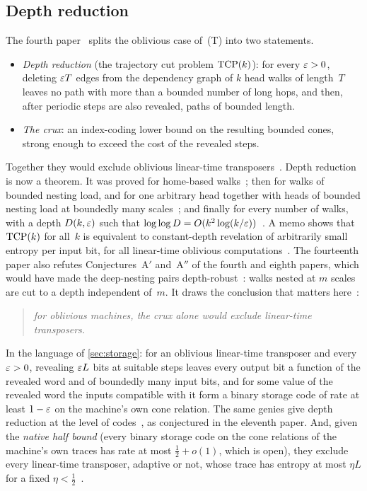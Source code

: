 \subsection{Depth reduction}\label{sec:depth}

The fourth paper~\cite{FourthPaper2026} splits the oblivious case of~(T) into two statements.
\begin{itemize}[leftmargin=1.5em]
\item \emph{Depth reduction} (the trajectory cut problem $\mathrm{TCP}(k)$): for every $\varepsilon>0$, deleting $\varepsilon T$ edges from
the dependency graph of $k$ head walks of length~$T$ leaves no path with more than a bounded number of long hops, and
then, after periodic steps are also revealed, paths of bounded length.
\item \emph{The crux}: an index-coding lower bound on the resulting bounded cones, strong enough to exceed the cost of
the revealed steps.
\end{itemize}
Together they would exclude oblivious linear-time
transposers~\cite[Theorem~4.10 and Corollary~4.11]{FourthPaper2026}. Depth reduction is now a theorem. It was proved
for home-based walks~\cite[Theorem~4.20]{FourthPaper2026}; then for walks of bounded nesting load, and for one arbitrary
head together with heads of bounded nesting load at boundedly many
scales~\cite[Theorems~3.6 and~4.2]{EighthPaper2026}; and finally for every number of walks, with a depth $D(k,\varepsilon)$
such that $\log\log D=O(k^2\log(k/\varepsilon))$~\cite[Theorem~7.5]{BoundedStack2026}. A memo shows that $\mathrm{TCP}(k)$ for all~$k$
is equivalent to constant-depth revelation of arbitrarily small entropy per input bit, for all linear-time oblivious
computations~\cite{InfoDepthMemo2026}. The fourteenth paper also refutes Conjectures~A$'$ and~A$''$ of the fourth and
eighth papers, which would have made the deep-nesting pairs
depth-robust~\cite[Corollary~9.1]{BoundedStack2026}: walks nested at $m$ scales are cut to a depth independent of~$m$.
It draws the conclusion that matters here~\cite[Corollary~9.3]{BoundedStack2026}:
\begin{quote}
\emph{for oblivious machines, the crux alone would exclude linear-time transposers.}
\end{quote}
In the language of \cref{sec:storage}: for an oblivious linear-time transposer and every $\varepsilon>0$, revealing $\varepsilon L$
bits at suitable steps leaves every output bit a function of the revealed word and of boundedly many input bits, and
for some value of the revealed word the inputs compatible with it form a binary storage code of rate at least $1-\varepsilon$
on the machine's own cone relation. The same genies give depth reduction at the level of
codes~\cite[Corollary~9.6]{BoundedStack2026}, as conjectured in the eleventh paper. And, given the \emph{native half
bound} (every binary storage code on the cone relations of the machine's own traces has rate at most
$\tfrac12+o(1)$, which is open), they exclude every linear-time transposer, adaptive or not, whose trace has entropy at
most $\eta L$ for a fixed $\eta<\tfrac12$~\cite[Corollary~9.7]{BoundedStack2026}.

